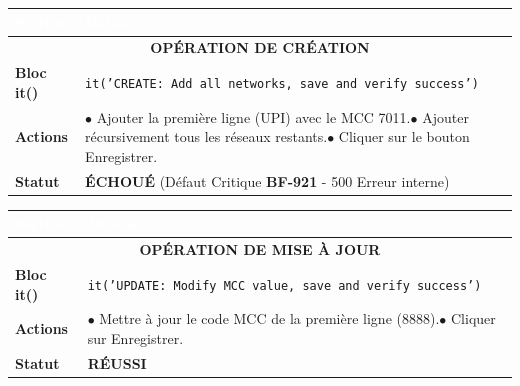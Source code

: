 \vspace{0.5cm}
\noindent
\begin{minipage}{\textwidth}
\renewcommand{\arraystretch}{1.5}
\begin{tabular}{|p{3cm}|p{12.5cm}|}
\hline
\rowcolor{primary}
\textcolor{white}{\textbf{Section}} & \textcolor{white}{\textbf{Détails}} \\
\hline
\multicolumn{2}{|c|}{\cellcolor{gray!20}\textbf{OPÉRATION DE CRÉATION}} \\
\hline
\textbf{Bloc it()} & \texttt{it('CREATE: Add all networks, save and verify success')} \\
\hline
\textbf{Actions} & $\bullet$ Ajouter la première ligne (UPI) avec le MCC 7011.\newline $\bullet$ Ajouter récursivement tous les réseaux restants.\newline $\bullet$ Cliquer sur le bouton Enregistrer. \\
\hline
\textbf{Statut} & \textcolor{danger}{\textbf{ÉCHOUÉ}} (Défaut Critique \textbf{BF-921} - 500 Erreur interne) \\
\hline
\end{tabular}
\end{minipage}

\vspace{0.5cm}
\noindent
\begin{minipage}{\textwidth}
\renewcommand{\arraystretch}{1.5}
\begin{tabular}{|p{3cm}|p{12.5cm}|}
\hline
\rowcolor{primary}
\textcolor{white}{\textbf{Section}} & \textcolor{white}{\textbf{Détails}} \\
\hline
\multicolumn{2}{|c|}{\cellcolor{gray!20}\textbf{OPÉRATION DE MISE À JOUR}} \\
\hline
\textbf{Bloc it()} & \texttt{it('UPDATE: Modify MCC value, save and verify success')} \\
\hline
\textbf{Actions} & $\bullet$ Mettre à jour le code MCC de la première ligne (8888).\newline $\bullet$ Cliquer sur Enregistrer. \\
\hline
\textbf{Statut} & \textcolor{success}{\textbf{RÉUSSI}} \\
\hline
\end{tabular}
\end{minipage}

